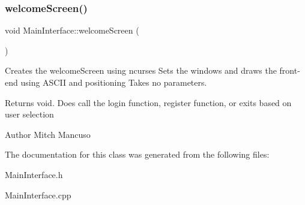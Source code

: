 \subsubsection{\texorpdfstring{welcome\+Screen()}{welcomeScreen()}}
{\footnotesize\ttfamily void Main\+Interface\+::welcome\+Screen (\begin{DoxyParamCaption}{ }\end{DoxyParamCaption})}



Creates the welcome\+Screen using ncurses  Sets the windows and draws the front-\/end using A\+S\+C\+II and positioning  Takes no parameters. 

\begin{DoxyReturn}{Returns}
void. Does call the login function, register function, or exits based on user selection 
\end{DoxyReturn}
\begin{DoxyAuthor}{Author}
Mitch Mancuso 
\end{DoxyAuthor}


The documentation for this class was generated from the following files\+:\begin{DoxyCompactItemize}
\item 
Main\+Interface.\+h\item 
Main\+Interface.\+cpp\end{DoxyCompactItemize}
